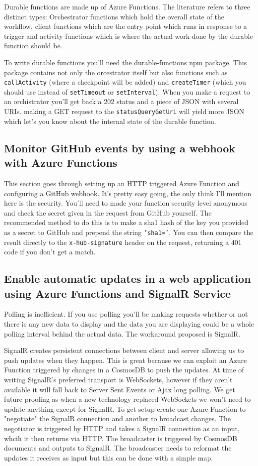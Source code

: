 \documentclass{article}
\newcommand{\code}{\texttt}
\begin{document}
Durable functions are made up of Azure Functions. The literature refers to three distinct types: Orchestrator functions which hold the overall state of the workflow, client functions which are the entry point which runs in response to a trigger and activity functions which is where the actual work done by the durable function should be. 

To write durable functions you'll need the durable-functions npm package. This package contains not only the orcestrator itself but also functions such as \code{callActivity} (where a checkpoint will be added) and \code{createTimer} (which you should use instead of \code{setTimeout} or \code{setInterval}).
When you make a request to an orchistrator you'll get back a 202 status and a piece of JSON with several URIs. making a GET request to the \code{statusQueryGetUri} will yield more JSON which let's you know about the internal state of the durable function.

\subsection{Monitor GitHub events by using a webhook with Azure Functions}
This section goes through setting up an HTTP triggered Azure Function and configuring a GitHub webhook. It's pretty easy going, the only think I'll mention here is the security. You'll need to made your function security level anonymous and check the secret given in the request from GitHub yourself. The recommended method to do this is to make a sha1 hash of the key you provided as a secret to GitHub and prepend the string \code{'sha1='}. You can then compare the result directly to the \code{x-hub-signature} header on the request, returning a 401 code if you don't get a match.

\subsection{Enable automatic updates in a web application using Azure Functions and SignalR Service}
Polling is inefficient. If you use polling you'll be making requests whether or not there is any new data to display and the data you are displaying could be a whole polling interval behind the actual data. The workaround proposed is SignalR. 

SignalR creates persistent connections between client and server allowing us to push updates when they happen. This is great because we can exploit an Azure Function triggered by changes in a CosmosDB to push the updates. At time of writing SignalR's preferred transport is WebSockets, however if they aren't available it will fall back to Server Sent Events or Ajax long polling. We get future proofing as when a new technology replaced WebSockets we won't need to update anything except for SignalR. 
To get setup create one Azure Function to "negotiate" the SignalR connection and another to broadcast changes. The negotiator is triggered by HTTP and takes a SignalR connection as an input, whcih it then returns via HTTP. The broadcaster is triggered by CosmosDB documents and outputs to SignalR. The broadcaster needs to reformat the updates it receives as input but this can be done with a simple map.
\end{document}
